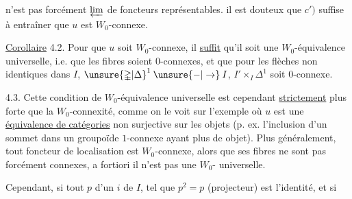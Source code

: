 n'est pas forcément $\varprojlim$ de foncteurs représentables.  il est douteux que $c')$ suffise à entraîner que $u$ est $W_0$-connexe.

\uline{Corollaire} 4.2. Pour que $u$ soit $W_0$-connexe, il \uline{suffit} qu'il soit une $W_0$-équivalence universelle, i.e.  que les fibres soient $0$-connexes, et que pour les flèches non identiques dans $I$,  $\unsure{\mathbb{\Delta}|\Delta}^1\mathbin{\unsure{-|\to}}I$, $I'\times_I\mathbb{\Delta}^1$ soit $0$-connexe.

4.3. Cette condition de $W_0$-équivalence universelle  est cependant \uline{strictement} plus forte que la $W_0$-connexité, comme on le voit sur l'exemple  où $u$ est une \uline{équivalence de catégories} non surjective sur les objets (p. ex. l'inclusion d'un sommet dans un groupoïde $1$-connexe ayant plus de  objet). Plus généralement, tout foncteur de localisation est $W_0$-connexe, alors que ses fibres ne sont pas forcément connexes,  a fortiori il n'est pas une $W_0$- universelle.

Cependant, si  tout  $p$ d'un $i$ de $I$, tel que $p^2=p$ (projecteur) est l'identité, et si
